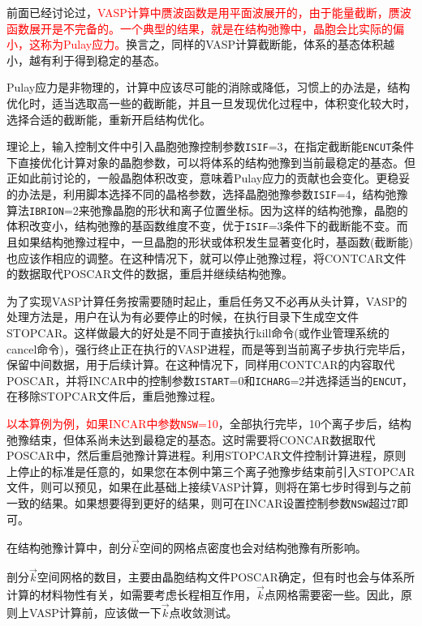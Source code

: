 前面已经讨论过，\textcolor{red}{\textrm{VASP}计算中赝波函数是用平面波展开的，由于能量截断，赝波函数展开是不完备的。一个典型的结果，就是在结构弛豫中，晶胞会比实际的偏小，这称为\textrm{Pulay}应力。}换言之，同样的\textrm{VASP}计算截断能，体系的基态体积越小，越有利于得到稳定的基态。

\textrm{Pulay}应力是非物理的，计算中应该尽可能的消除或降低，习惯上的办法是，结构优化时，适当选取高一些的截断能，并且一旦发现优化过程中，体积变化较大时，选择合适的截断能，重新开启结构优化。

理论上，输入控制文件中引入晶胞弛豫控制参数\texttt{ISIF}=3，在指定截断能\texttt{ENCUT}条件下直接优化计算对象的晶胞参数，可以将体系的结构弛豫到当前最稳定的基态。但正如此前讨论的，一般晶胞体积改变，意味着\textrm{Pulay}应力的贡献也会变化。更稳妥的办法是，利用脚本选择不同的晶格参数，选择晶胞弛豫参数\texttt{ISIF}=4，结构弛豫算法\texttt{IBRION}=2来弛豫晶胞的形状和离子位置坐标。因为这样的结构弛豫，晶胞的体积改变小，结构弛豫的基函数维度不变，优于\texttt{ISIF}=3条件下的截断能不变。而且如果结构弛豫过程中，一旦晶胞的形状或体积发生显著变化时，基函数(截断能)也应该作相应的调整。在这种情况下，就可以停止弛豫过程，将\textrm{CONTCAR}文件的数据取代\textrm{POSCAR}文件的数据，重启并继续结构弛豫。

为了实现\textrm{VASP}计算任务按需要随时起止，重启任务又不必再从头计算，\textrm{VASP}的处理方法是，用户在认为有必要停止的时候，在执行目录下生成空文件\textrm{STOPCAR}。这样做最大的好处是不同于直接执行\textrm{kill}命令(或作业管理系统的\textrm{cancel}命令)，强行终止正在执行的\textrm{VASP}进程，而是等到当前离子步执行完毕后，保留中间数据，用于后续计算。在这种情况下，同样用\textrm{CONTCAR}的内容取代\textrm{POSCAR}，并将\textrm{INCAR}中的控制参数\texttt{ISTART}=0和\texttt{ICHARG}=2并选择适当的\texttt{ENCUT}，在移除\textrm{STOPCAR}文件后，重启弛豫过程。

\textcolor{red}{以本算例为例，如果\textrm{INCAR}中参数\texttt{NSW}=10}，全部执行完毕，10个离子步后，结构弛豫结束，但体系尚未达到最稳定的基态。这时需要将\textrm{CONCAR}数据取代\textrm{POSCAR}中，然后重启弛豫计算进程。利用\textrm{STOPCAR}文件控制计算进程，原则上停止的标准是任意的，如果您在本例中第三个离子弛豫步结束前引入\textrm{STOPCAR}文件，则可以预见，如果在此基础上接续\textrm{VASP}计算，则将在第七步时得到与之前一致的结果。如果想要得到更好的结果，则可在\textrm{INCAR}设置控制参数\texttt{NSW}超过7即可。

在结构弛豫计算中，剖分$\vec k$空间的网格点密度也会对结构弛豫有所影响。

剖分$\vec k$空间网格的数目，主要由晶胞结构文件\textrm{POSCAR}确定，但有时也会与体系所计算的材料物性有关，如需要考虑长程相互作用，$\vec k$点网格需要密一些。因此，原则上\textrm{VASP}计算前，应该做一下$\vec k$点收敛测试。

